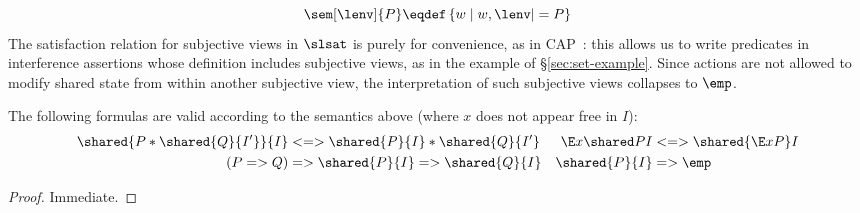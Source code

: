 %
\[
	\sem[\lenv]{P} \eqdef \left\{ w \mid w, \lenv |= P \right\}
\]	
%
The satisfaction relation for subjective views in $\slsat$ is purely for convenience, as in CAP~\cite{cap-ecoop10}: this allows us to write predicates in interference assertions whose definition includes subjective views, as in the example of \S\ref{sec:set-example}. Since actions are not allowed to modify shared state from within another subjective view, the interpretation of such subjective views collapses to $\emp$.


\begin{lemma}\label{lem:assertionFacts}
The following formulas are valid according to the semantics above (where $x$ does not appear free in $I$):
%
\begin{align*}
	\shared{P * \shared{Q}{I'}}{I} &<=> \shared{P}{I} * \shared{Q}{I'}&
	\E x \shared P I &<=>\shared{\E x P} I\\
%
	(P => Q) &=> \shared{P}{I} => \shared{Q}{I}&
	\shared{P}{I} &=> \emp
\end{align*}
%
\end{lemma}
%
\begin{proof}
  Immediate.
\end{proof}
%

